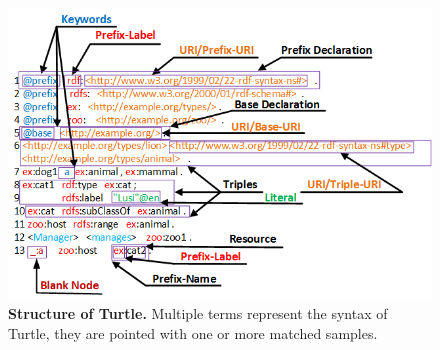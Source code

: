 \begin{figure}[ht]
	\begin{center}
		\includegraphics[scale=0.8,angle=0]{images/TurtleStructure.png}
		\setlength\belowcaptionskip{-5mm}
		\caption{\textbf{Structure of Turtle.} Multiple terms represent the syntax of Turtle, they are pointed with one or more matched samples.}
		\label{Fig:TurtleStructure}
	\end{center}
\end{figure}
